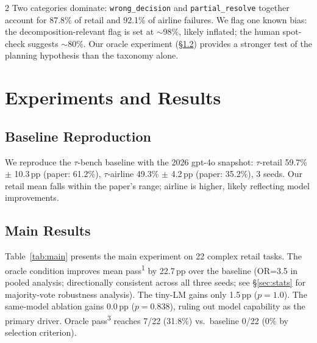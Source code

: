 \documentclass[11pt,a4paper]{article}
\begin{document}
\begin{multicols}{2}
Two categories dominate: \texttt{wrong\_decision} and \texttt{partial\_resolve} together account for 87.8\% of retail and 92.1\% of airline failures. We flag one known bias: the decomposition-relevant flag is set at ${\sim}$98\%, likely inflated; the human spot-check suggests ${\sim}$80\%. Our oracle experiment (\S\ref{sec:main}) provides a stronger test of the planning hypothesis than the taxonomy alone.


\section{Experiments and Results}\label{sec:experiments}

\subsection{Baseline Reproduction}

We reproduce the $\tau$-bench baseline with the 2026 gpt-4o snapshot: $\tau$-retail 59.7\% $\pm$ 10.3\,pp (paper: 61.2\%), $\tau$-airline 49.3\% $\pm$ 4.2\,pp (paper: 35.2\%), 3 seeds. Our retail mean falls within the paper's range; airline is higher, likely reflecting model improvements.

\subsection{Main Results}\label{sec:main}

Table~\ref{tab:main} presents the main experiment on 22 complex retail tasks. The oracle condition improves mean pass\textsuperscript{1} by 22.7\,pp over the baseline (OR=3.5 in pooled analysis; directionally consistent across all three seeds; see \S\ref{sec:stats} for majority-vote robustness analysis). The tiny-LM gains only 1.5\,pp ($p=1.0$). The same-model ablation gains 0.0\,pp ($p=0.838$), ruling out model capability as the primary driver. Oracle pass\textsuperscript{3} reaches 7/22 (31.8\%) vs.\ baseline 0/22 (0\% by selection criterion).


\end{multicols}
\end{document}
